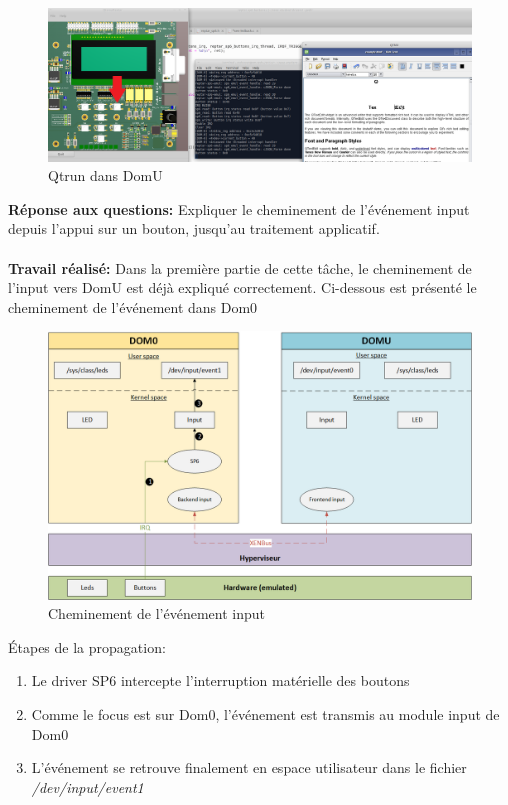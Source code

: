 \begin{figure}[H]
	\begin{center}
		\includegraphics[width=16cm]{img/dom03.png}
		\caption{Qtrun dans DomU}
		\label{qtrun3}
	\end{center}
\end{figure}
\textbf{Réponse aux questions: }Expliquer le cheminement de l'événement input depuis l'appui sur un bouton, jusqu'au traitement applicatif.\\\\
\textbf{Travail réalisé: }Dans la première partie de cette tâche, le cheminement de l'input vers DomU est déjà expliqué correctement. Ci-dessous est présenté le cheminement de l'événement dans Dom0
\begin{figure}[H]
	\begin{center}
		\includegraphics[width=17cm]{img/virt2.png}
		\caption{Cheminement de l'événement input}
		\label{virt2}
	\end{center}
\end{figure}
Étapes de la propagation:
\begin{enumerate}
	\item Le driver SP6 intercepte l'interruption matérielle des boutons
	\item Comme le focus est sur Dom0, l'événement est transmis au module input de Dom0
	\item L'événement se retrouve finalement en espace utilisateur dans le fichier \textit{/dev/input/event1}
\end{enumerate}
